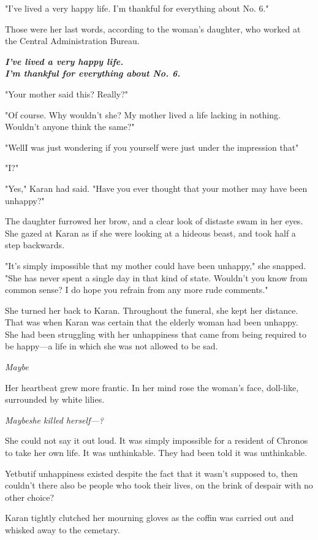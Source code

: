 "I've lived a very happy life. I'm thankful for everything about No. 6."

Those were her last words, according to the woman's daughter, who worked
at the Central Administration Bureau.

\textbf{\emph{I've lived a very happy life.\\I'm thankful for everything about No. 6.}}

"Your mother said this? Really?"

"Of course. Why wouldn't she? My mother lived a life lacking in nothing.
Wouldn't anyone think the same?"

"Well\el I was just wondering if you yourself were just under the
impression that\el "

"I?"

"Yes," Karan had said. "Have you ever thought that your mother may have
been unhappy?"

The daughter furrowed her brow, and a clear look of distaste swam in her
eyes. She gazed at Karan as if she were looking at a hideous beast, and
took half a step backwards.

"It's simply impossible that my mother could have been unhappy," she
snapped. "She has never spent a single day in that kind of state.
Wouldn't you know from common sense? I do hope you refrain from any more
rude comments."

She turned her back to Karan. Throughout the funeral, she kept her
distance. That was when Karan was certain that the elderly woman had
been unhappy. She had been struggling with her unhappiness that came
from being required to be happy---a life in which she was not allowed to
be sad.

\emph{Maybe\el }

Her heartbeat grew more frantic. In her mind rose the woman's face,
doll-like, surrounded by white lilies.

\emph{Maybe\el she killed herself---?}

She could not say it out loud. It was simply impossible for a resident
of Chronos to take her own life. It was unthinkable. They had been told
it was unthinkable.

Yet\el but\el if unhappiness existed despite the fact that it wasn't
supposed to, then couldn't there also be people who took their lives, on
the brink of despair with no other choice?

Karan tightly clutched her mourning gloves as the coffin was carried out
and whisked away to the cemetary.

